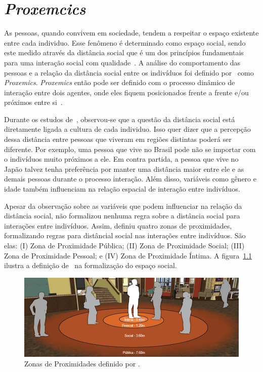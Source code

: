 \chapter{\emph{Proxemcics}}
\label{cap:proxemics}
As pessoas, quando convivem em sociedade, tendem a respeitar o espaço existente entre cada individuo. Esse fenômeno é determinado como espaço social, sendo este medido através da distância social que é um dos princípios fundamentais para uma interação social com qualidade~\cite{Hall:1969, Henkel:2014}. A análise do comportamento das pessoas e a relação da distância social entre os indivíduos foi definido por~ como \emph{Proxemics}. \emph{Proxemics} então pode ser definido com o processo dinâmico de interação entre dois agentes, onde eles fiquem posicionados frente a frente e/ou próximos entre si~\cite{Mead:2011b}.

Durante os estudos de~, observou-se que a questão da distância social está diretamente ligada a cultura de cada individuo. Isso quer dizer que a percepção dessa distância entre pessoas que viveram em regiões distintas poderá ser diferente. Por exemplo, uma pessoa que vive no Brasil pode não se importar com o indivíduos muito próximos a ele. Em contra partida, a pessoa que vive no Japão talvez tenha preferência por manter uma distância maior entre ele e as demais pessoas durante o processo interação. Além disso, variáveis como gênero e idade também influenciam na relação espacial de interação entre indivíduos.

Apesar da observação sobre as variáveis que podem influenciar na relação da distância social,  não formalizou nenhuma regra sobre a distância social para interações entre indivíduos. Assim,  definiu quatro zonas de proximidades, formalizando regras para distâncial social nas interações entre indivíduos. São elas: (I) Zona de Proximidade Pública; (II) Zona de Proximidade Social; (III) Zona de Proximidade Pessoal; e (IV) Zona de Proximidade Íntima. A figura~\ref{fig:proximityzones} ilustra a definição de~ na formalização do espaço social.

\begin{figure}[ht!]
	\centering
	\includegraphics[width=\textwidth]{images/proxemicszones.png}
	\caption{Zonas de Proximidades definido por .}
	\label{fig:proximityzones}
\end{figure}

